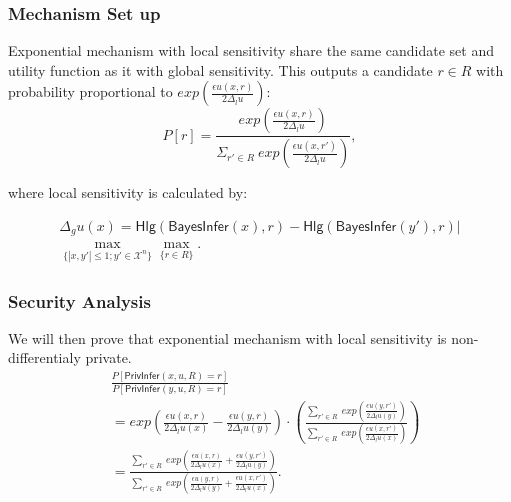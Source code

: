 \documentclass{article}
\begin{document}
\subsubsection{Mechanism Set up}
Exponential mechanism with local sensitivity share the same candidate set and utility function as it with global sensitivity. This outputs a candidate $r \in R$ with probability proportional to $exp(\frac{\epsilon u(x,r)}{2 \Delta_{l}u})$:
\begin{equation*}
P[r] = \frac
{exp(\frac{\epsilon u(x,r)}{2 \Delta_{l}u})}
{\Sigma_{r' \in R}\ exp(\frac{\epsilon u(x,r')}{2 \Delta_{l}u})},
\end{equation*}

where local sensitivity is calculated by:

\begin{multline*}
\Delta_{g}u(x) = 
\mathsf{Hlg}(\mathsf{BayesInfer}(x), r) - \mathsf{Hlg}(\mathsf{BayesInfer}(y'), r)|\\
\max_{\{|x,y'| \leq 1;y'\in \mathcal{X}^n\}}\max_{\{r\in R\}}.
\end{multline*}

\subsubsection{Security Analysis}
We will then prove that exponential mechanism with local sensitivity is non-differentialy private.
\begin{equation*}
\begin{split}
& \frac{P[\mathsf{PrivInfer}(x,u,R) = r]}{P[\mathsf{PrivInfer}(y,u,R) = r]} \\
& = exp\left(
\frac{\epsilon u(x,r)}{2 \Delta_{l}u(x)} - 
\frac{\epsilon u(y,r)}{2 \Delta_{l}u(y)}
\right)  \cdot
\left(\frac
{\sum\limits_{r' \in R}\ exp(\frac{\epsilon u(y,r')}{2 \Delta_{l}u(y)})}
{\sum\limits_{r' \in R}\ exp(\frac{\epsilon u(x,r')}{2 \Delta_{l}u(x)})}
\right) \\
& = \frac
{\sum\limits_{r' \in R}\ exp(\frac{\epsilon u(x,r)}{2 \Delta_{l}u(x)} 
+ \frac{\epsilon u(y,r')}{2 \Delta_{l}u(y)})}
{\sum\limits_{r' \in R}\ exp(\frac{\epsilon u(y,r)}{2 \Delta_{l}u(y)} 
+ \frac{\epsilon u(x,r')}{2 \Delta_{l}u(x)})}.
\end{split}
\end{equation*}
\end{document}
